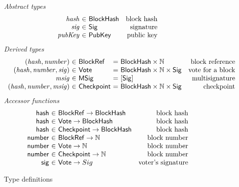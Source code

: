 \begin{figure*}[htb]
  \emph{Abstract types}
  \begin{equation*}
    \begin{array}{r@{~\in~}lr}
      \var{hash} & \BH & \text{block hash}\\
      \var{sig} & \Sig & \text{signature}\\
      \var{pubKey} & \PubKey & \text{public key}\\
    \end{array}
  \end{equation*}
  \emph{Derived types}
  \begin{equation*}
    \begin{array}{r@{~\in~}l@{~=~}lr}
      (\var{hash}, \var{number})
      & \BlockRef
      & \BH \times \N
      & \text{block reference}
      \\
      (\var{hash}, \var{number}, \var{sig})
      & \Vote
      & \BH \times \N \times \Sig
      & \text{vote for a block}
      \\
      \var{msig}
      & \MSig
      & [\Sig]
      & \text{multisignature}
      \\
      (\var{hash}, \var{number}, \var{msig})
      & \Chkp
      & \BH \times \N \times \Sig
      & \text{checkpoint}
      \\
    \end{array}
  \end{equation*}
  \emph{Accessor functions}
  \begin{equation*}
    \begin{array}{r@{~\in~}lr}
      \fun{hash} & \BlockRef \to \BH & \text{block hash} \\
      \fun{hash} & \Vote \to \BH & \text{block hash} \\
      \fun{hash} & \Chkp \to \BH & \text{block hash} \\
      \fun{number} & \BlockRef \to \N & \text{block number} \\
      \fun{number} & \Vote \to \N & \text{block number} \\
      \fun{number} & \Chkp \to \N & \text{block number} \\
      \fun{sig} & \Vote \to Sig & \text{voter's signature} \\
    \end{array}
  \end{equation*}
  \caption{Type definitions}
  \label{fig:base-defs}
\end{figure*}

